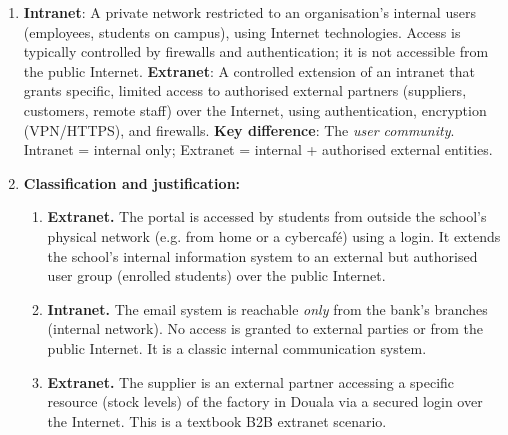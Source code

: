 \documentclass[11pt]{article}
\newcommand{\cle}[1]{{\popxbold\color{popdark}#1}}
\begin{document}
\begin{corrige}
\begin{enumerate}
\item \textbf{\cle{Intranet}}: A private network restricted to an organisation's internal users (employees, students on campus), using Internet technologies. Access is typically controlled by firewalls and authentication; it is not accessible from the public Internet.
\textbf{\cle{Extranet}}: A controlled extension of an intranet that grants specific, limited access to authorised external partners (suppliers, customers, remote staff) over the Internet, using authentication, encryption (VPN/HTTPS), and firewalls.
\textbf{Key difference}: The \emph{user community}. Intranet = internal only; Extranet = internal + authorised external entities.
\item \textbf{Classification and justification:}
\begin{enumerate}
\item \textbf{Extranet.} The portal is accessed by students from outside the school's physical network (e.g. from home or a cybercafé) using a login. It extends the school's internal information system to an external but authorised user group (enrolled students) over the public Internet.
\item \textbf{Intranet.} The email system is reachable \emph{only} from the bank's branches (internal network). No access is granted to external parties or from the public Internet. It is a classic internal communication system.
\item \textbf{Extranet.} The supplier is an external partner accessing a specific resource (stock levels) of the factory in Douala via a secured login over the Internet. This is a textbook B2B extranet scenario.
\end{enumerate}
\end{enumerate}
\end{corrige}
\end{document}
